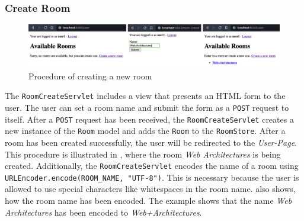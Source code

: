 \subsubsection{Create Room}\label{subsubsec:03_impl_servlets_createroom}
\begin{figure}[h]
\centering
\includegraphics[scale=0.15]{images/03_impl/create-room/create-room}
\caption{Procedure of creating a new room}
\label{fig:03_impl_servlets_createroom_create}
\end{figure}
The \texttt{RoomCreateServlet} includes a view that presents an HTML form to the user. The user can set a room name and submit the form as a \texttt{POST} request to itself.
After a \texttt{POST} request has been received, the \texttt{RoomCreateServlet} creates a new instance of the \texttt{Room} model and adds the \texttt{Room} to the \texttt{RoomStore}. After a room has been created successfully, the user will be redirected to the \textit{User-Page}. This procedure is illustrated in , where the room \textit{Web Architectures} is being created.
Additionally, the \texttt{RoomCreateServlet} encodes the name of a room using \texttt{URLEncoder.encode(ROOM\_NAME, "UTF-8")}. This is necessary because the user is allowed to use special characters like whitespaces in the room name.  also shows, how the room name has been encoded. The example shows that the name \textit{Web Architectures} has been encoded to \textit{Web+Architectures}.


\newpage
